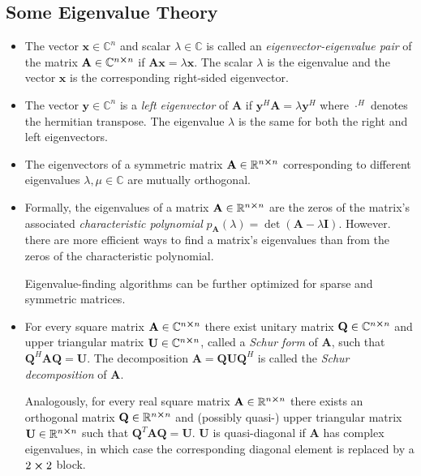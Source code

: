 \documentclass[11pt, a4paper]{article}
\newcommand{\R}{\mathbb{R}} %
\newcommand{\C}{\mathbb{C}} %
\newcommand{\mat}[1]{\mathbf{#1}} %
\begin{document}
\subsection{Some Eigenvalue Theory}
\begin{itemize}
	\item The vector $ \bm{x} \in \mathbb{C}^{n} $ and scalar $ \lambda \in \mathbb{C}  $ is called an \textit{eigenvector-eigenvalue pair} of the matrix $ \mat{A} \in \mathbb{C}^{n \cross n} $ if $ \mat{A} \bm{x} = \lambda \bm{x} $. The scalar $ \lambda $ is the eigenvalue and the vector $ \bm{x} $ is the corresponding right-sided eigenvector. 
	
	\item The vector $ \bm{y} \in \mathbb{C}^{n} $ is a \textit{left eigenvector} of $ \mat{A} $ if $ \bm{y}^{H} \mat{A} = \lambda \bm{y}^{H}$ where $ \cdot^{H} $ denotes the hermitian transpose. The eigenvalue $ \lambda $ is the same for both the right and left eigenvectors.
	
	\item The eigenvectors of a symmetric matrix $ \mat{A} \in \R^{n \cross n} $ corresponding to different eigenvalues $ \lambda, \mu \in  \C$ are mutually orthogonal.
	
	\item Formally, the eigenvalues of a matrix $ \mat{A} \in \R^{n \cross n} $ are the zeros of the matrix's associated \textit{characteristic polynomial} $ p_{\mat{A}}(\lambda) = \det(\mat{A} - \lambda \mat{I}) $. However. there are more efficient ways to find a matrix's eigenvalues than from the zeros of the characteristic polynomial. 
	
	Eigenvalue-finding algorithms can be further optimized for sparse and symmetric matrices.
	
	\item For every square matrix $ \mat{A} \in \C^{n \cross n} $ there exist unitary matrix $ \mat{Q} \in \C^{n \cross n} $ and upper triangular matrix $ \mat{U} \in \C^{n \cross n} $, called a \textit{Schur form} of $ \mat{A} $, such that $ \mat{Q}^{H}\mat{A} \mat{Q} = \mat{U} $. The decomposition $ \mat{A} = \mat{Q} \mat{U} \mat{Q}^{H}  $ is called the \textit{Schur decomposition} of $ \mat{A} $.
	
	Analogously, for every real square matrix $ \mat{A} \in \R^{n \cross n} $ there exists an orthogonal matrix $ \mat{Q} \in \R^{n \cross n} $ and (possibly quasi-) upper triangular matrix $ \mat{U} \in \R^{n \cross n} $ such that $ \mat{Q}^{T}\mat{A} \mat{Q} = \mat{U} $. $ \mat{U} $ is quasi-diagonal if $ \mat{A} $ has complex eigenvalues, in which case the corresponding diagonal element is replaced by a $ 2 \cross 2 $ block.
\end{itemize}
\end{document}
